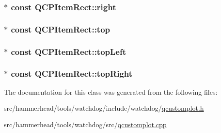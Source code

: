 \subsubsection[{\texorpdfstring{right}{right}}]{$\ast$ const Q\+C\+P\+Item\+Rect\+::right}\hypertarget{classQCPItemRect_a7979c1915f61ad2609a9cc179c2e445e}{}\label{classQCPItemRect_a7979c1915f61ad2609a9cc179c2e445e}
\subsubsection[{\texorpdfstring{top}{top}}]{$\ast$ const Q\+C\+P\+Item\+Rect\+::top}\hypertarget{classQCPItemRect_a96e50db552fb297d6fb62614676217bc}{}\label{classQCPItemRect_a96e50db552fb297d6fb62614676217bc}
\subsubsection[{\texorpdfstring{top\+Left}{topLeft}}]{$\ast$ const Q\+C\+P\+Item\+Rect\+::top\+Left}\hypertarget{classQCPItemRect_aa70feeef173489b03c3fbe906a5023c4}{}\label{classQCPItemRect_aa70feeef173489b03c3fbe906a5023c4}
\subsubsection[{\texorpdfstring{top\+Right}{topRight}}]{$\ast$ const Q\+C\+P\+Item\+Rect\+::top\+Right}\hypertarget{classQCPItemRect_a77e0eb6e4aa6efee620d35e2c21bdad7}{}\label{classQCPItemRect_a77e0eb6e4aa6efee620d35e2c21bdad7}


The documentation for this class was generated from the following files\+:\begin{DoxyCompactItemize}
\item 
src/hammerhead/tools/watchdog/include/watchdog/\hyperlink{qcustomplot_8h}{qcustomplot.\+h}\item 
src/hammerhead/tools/watchdog/src/\hyperlink{qcustomplot_8cpp}{qcustomplot.\+cpp}\end{DoxyCompactItemize}
